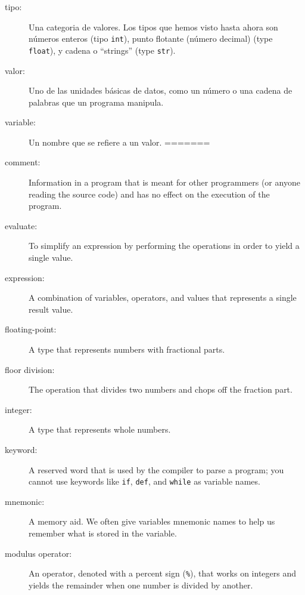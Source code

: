 \begin{ex}
\begin{description}
\begin{description}
\item[tipo:] Una categoria de valores.  Los tipos que hemos visto hasta ahora son n\'umeros enteros (tipo {\tt int}), punto flotante (n\'umero decimal) (type {\tt
float}), y cadena o ``strings'' (type {\tt str}).

\item[valor:]  Uno de las unidades b\'asicas de datos, como un n\'umero o una cadena de palabras que un programa manipula.

\item[variable:]  Un nombre que se refiere a un valor.
=======
\item[comment:]  Information in a program that is meant for other
programmers (or anyone reading the source code) and has no effect on the
execution of the program.

\item[evaluate:]  To simplify an expression by performing the operations
in order to yield a single value.

\item[expression:]  A combination of variables, operators, and values that
represents a single result value.

\item[floating-point:] A type that represents numbers with fractional
parts.

\item[floor division:] The operation that divides two numbers and chops off
the fraction part.

\item[integer:] A type that represents whole numbers.

\item[keyword:]  A reserved word that is used by the compiler to parse a
program; you cannot use keywords like {\tt if}, {\tt  def}, and {\tt while} as
variable names.

\item[mnemonic:] A memory aid. We often give variables mnemonic names
to help us remember what is stored in the variable.

\item[modulus operator:]  An operator, denoted with a percent sign
({\tt \%}), that works on integers and yields the remainder when one
number is divided by another.


\end{description}
\end{description}
\end{ex}
